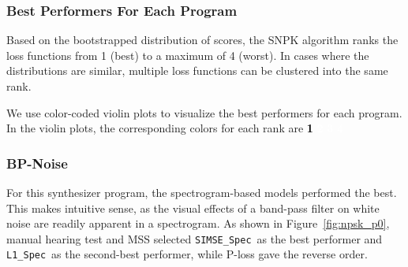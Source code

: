 \documentclass[lettersize,journal]{IEEEtran}
\newcommand{\SIMSESpec}{\texttt{SIMSE\_Spec}}
\newcommand{\LoneSpec}{\texttt{L1\_Spec}}
\newcommand{\BPNoise}{\textbf{BP-Noise}}
\begin{document}
\subsubsection{Best Performers For Each Program}
Based on the bootstrapped distribution of scores, the SNPK algorithm ranks the loss functions from 1 (best) to a maximum of 4 (worst). In cases where the distributions are similar, multiple loss functions can be clustered into the same rank. 

We use color-coded violin plots to visualize the best performers for each program. In the violin plots, the corresponding colors for each rank are
\colorbox{rank1}{\textcolor{black}{\textbf{1}}} \colorbox{rank2}{\textcolor{white}{\textbf{2}}} \colorbox{rank3}{\textcolor{white}{\textbf{3}}} \colorbox{rank4}{\textcolor{black}{\textcolor{white}{\textbf{4}}}}

\subsubsection{\BPNoise}
For this synthesizer program, the spectrogram-based models performed the best. This makes intuitive sense, as the visual effects of a band-pass filter on white noise are readily apparent in a spectrogram. As shown in Figure~\ref{fig:npsk_p0}, manual hearing test and MSS selected \SIMSESpec~as the best performer and \LoneSpec~as the second-best performer, while P-loss gave the reverse order. 
\end{document}
